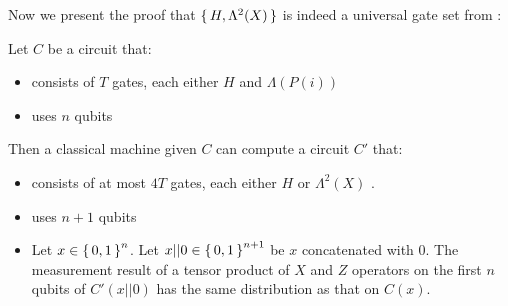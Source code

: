 Now we present the proof that $\set{H, \Lambda^2(X)}$ is indeed a universal gate set from \cite{quant-ph/0301040}: 
\begin{thm}
	Let $C$ be a circuit that:
	\begin{itemize}
		\item consists of $T$ gates, each either $H$ and $\Lambda(P(i))$
		\item uses $n$ qubits
	\end{itemize}
	Then a classical machine given $C$ can compute a circuit $C'$ that:
	\begin{itemize}
		\item consists of at most $4T$ gates, each either $H$ or $\Lambda^2(X)$ .
		\item uses $n+1$ qubits
		\item Let $x\in\set{0,1}^n$. Let $x|| 0\in\set{0,1}^{n+1}$ be $x$ concatenated with $0$.
		The measurement result of a tensor product of $X$ and $Z$ operators on the first $n$ qubits of $C'(x||0)$ has the same distribution as that on $C(x)$.
	\end{itemize}
\end{thm}
